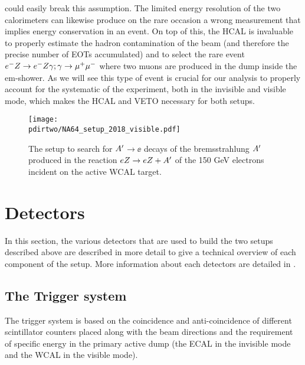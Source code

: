 could easily break this assumption. The limited energy resolution of the two calorimeters can likewise produce on the rare occasion a wrong measurement that implies energy conservation in an event. On top of this, the HCAL is invaluable to properly estimate the hadron contamination of the beam (and therefore the precise number of EOTs accumulated) and to select the rare event $e^- Z \to e^- Z \gamma; \gamma \to \mu^+ \mu^-$ where two muons are produced in the dump inside the em-shower. As we will see this type of event is crucial for our analysis to properly account for the systematic of the experiment, both in the invisible and visible mode, which makes the HCAL and VETO necessary for both setups.

\iffalse
The method of the search for $\aee$ (or $\xdecay$) decays is detailed in . Here, we review it briefly. The $\DM$ is produced via scattering of 150 GeV electrons off nuclei of an active target-dump. The $\DM$ production is followed by its decay into $\ee$ pairs:
detailed in \cite{Gninenko:2013rka, Andreas:2013lya, gkkk1, DMsimulation}, 
\begin{equation}
e^- + Z \to e^- + Z + \DM ;~ \DM\to \ee \,.
\label{ea}
\end{equation}
\fi

\begin{figure}[tb]
\centering
\texttt{[image: \\pdirtwo/NA64\_setup\_2018\_visible.pdf]}
\caption[NA64 visible mode setup 2018]{The setup to search for $\DM$$\to \ee$ decays of the bremsstrahlung $\DM$ produced in the reaction
$eZ \to eZ+A' $ of the 150 GeV electrons incident on the active WCAL target.}
\label{fig:setup-vis-2018}
\end{figure}

\section{Detectors}
\label{ch2:sec:detectors}

In this section, the various detectors that are used to build the two setups described above are described in more detail to give a technical overview of each component of the setup. More information about each detectors are detailed in \cite{na64-hcal,na64-detectors,ABBON201569}. 

\subsection{The Trigger system}
\label{ch2:sec:detectors-trigger}

The trigger system is based on the coincidence and anti-coincidence of different scintillator counters placed along with the beam directions and the requirement of specific energy in the primary active dump (the ECAL in the invisible mode and the WCAL in the visible mode).


